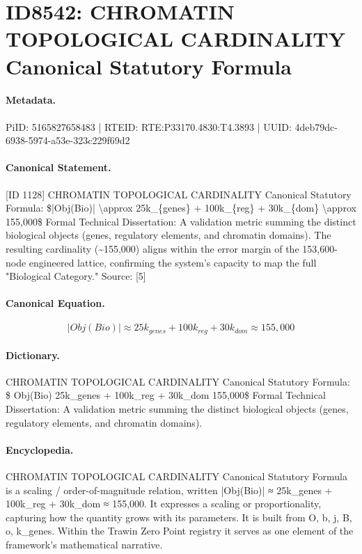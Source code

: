 \section*{ID8542: CHROMATIN TOPOLOGICAL CARDINALITY Canonical Statutory Formula}
\paragraph{Metadata.}
PiID: 5165827658483 | RTEID: RTE:P33170.4830:T4.3893 | UUID: 4deb79dc-6938-5974-a53e-323c229f69d2

\paragraph{Canonical Statement.}
[ID 1128] CHROMATIN TOPOLOGICAL CARDINALITY Canonical Statutory Formula: \$|Obj(Bio)| \textbackslash{}approx 25k\_\{genes\} + 100k\_\{reg\} + 30k\_\{dom\} \textbackslash{}approx 155,000\$ Formal Technical Dissertation: A validation metric summing the distinct biological objects (genes, regulatory elements, and chromatin domains). The resulting cardinality (\textasciitilde{}155,000) aligns within the error margin of the 153,600-node engineered lattice, confirming the system's capacity to map the full "Biological Category." Source: [5]

\paragraph{Canonical Equation.}
\[
|Obj(Bio)| \approx 25k_{genes} + 100k_{reg} + 30k_{dom} \approx 155,000
\]

\paragraph{Dictionary.}
CHROMATIN TOPOLOGICAL CARDINALITY Canonical Statutory Formula: \$ Obj(Bio) 25k\_genes + 100k\_reg + 30k\_dom 155,000\$ Formal Technical Dissertation: A validation metric summing the distinct biological objects (genes, regulatory elements, and chromatin domains).

\paragraph{Encyclopedia.}
CHROMATIN TOPOLOGICAL CARDINALITY Canonical Statutory Formula is a scaling / order-of-magnitude relation, written |Obj(Bio)| ≈ 25k\_genes + 100k\_reg + 30k\_dom ≈ 155,000. It expresses a scaling or proportionality, capturing how the quantity grows with its parameters. It is built from O, b, j, B, o, k\_genes. Within the Trawin Zero Point registry it serves as one element of the framework's mathematical narrative.
